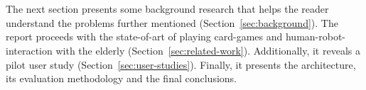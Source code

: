 \section*{\centering*}

The next section presents some background research that helps the reader understand the problems further mentioned (Section~\ref{sec:background}).
The report proceeds with the state-of-art of playing card-games and human-robot-interaction with the elderly (Section~\ref{sec:related-work}).
Additionally, it reveals a pilot user study (Section~\ref{sec:user-studies}).
Finally, it presents the architecture, its evaluation methodology and the final conclusions.
